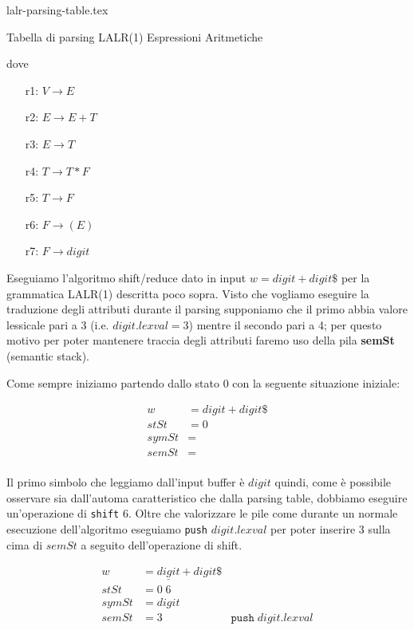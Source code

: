 \documentclass[class=book, crop=false, oneside, 12pt]{standalone}
\begin{document}
\begin{table}[H]
    \centering
    {lalr-parsing-table.tex}
    \caption{Tabella di parsing LALR(1) Espressioni Aritmetiche}
    \label{tab:lalr-parsing-table}
\end{table}

dove

\begin{itemize}
    \item[r1:] \(V \to E\) 
    \item[r2:] \(E \to E + T\)
    \item[r3:] \(E \to T\)
    \item[r4:] \(T \to T * F\)
    \item[r5:] \(T \to F\)
    \item[r6:] \(F \to (E)\)
    \item[r7:] \(F \to digit\)
\end{itemize}

Eseguiamo l'algoritmo shift/reduce dato in input \(w = digit + digit\$\) per la grammatica LALR(1) descritta poco sopra. Visto che vogliamo eseguire la traduzione degli attributi durante il parsing supponiamo che il primo abbia valore lessicale pari a 3 (i.e. \(digit.lexval = 3\)) mentre il secondo pari a 4; per questo motivo per poter mantenere traccia degli attributi faremo uso della pila \textbf{semSt} (semantic stack). 

Come sempre iniziamo partendo dallo stato 0 con la seguente situazione iniziale:

\begin{align*}
    w &= digit + digit\$ \\
    stSt &= 0 \\
    symSt &= \\     
    semSt &= \\
\end{align*}

Il primo simbolo che leggiamo dall'input buffer è \(digit\) quindi, come è possibile osservare sia dall'automa caratteristico che dalla parsing table, dobbiamo eseguire un'operazione di \texttt{shift} 6. Oltre che valorizzare le pile come durante un normale esecuzione dell'algoritmo eseguiamo \texttt{push} \(digit.lexval\) per poter inserire 3 sulla cima di \(semSt\) a seguito dell'operazione di shift.

\begin{align*}
    w &= \underline{digit} + digit\$ \\
    stSt &= 0\; 6 \\
    symSt &= digit \\     
    semSt &= 3 &\texttt{push}\;digit.lexval \\
\end{align*}
\end{document}
